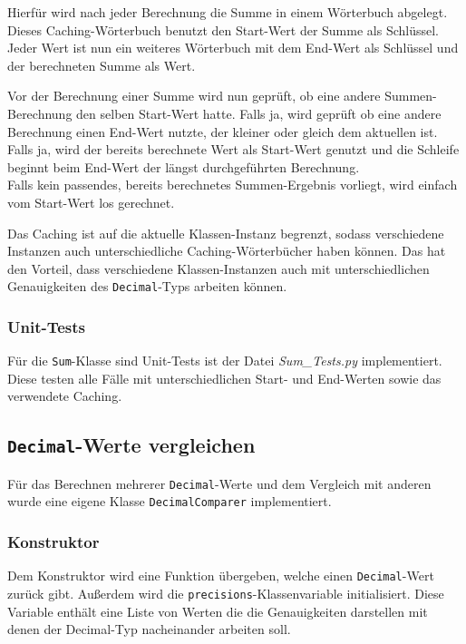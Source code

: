 \documentclass{article}
\begin{document}
		Hierfür wird nach jeder Berechnung die Summe in einem Wörterbuch abgelegt. Dieses Caching-Wörterbuch benutzt den Start-Wert der Summe als Schlüssel. Jeder Wert ist nun ein weiteres Wörterbuch mit dem End-Wert als Schlüssel und der berechneten Summe als Wert.
		
		Vor der Berechnung einer Summe wird nun geprüft, ob eine andere Summen-Berechnung den selben Start-Wert hatte. Falls ja, wird geprüft ob eine andere Berechnung einen End-Wert nutzte, der kleiner oder gleich dem aktuellen ist.  Falls ja, wird der bereits berechnete Wert als Start-Wert genutzt und die Schleife beginnt beim End-Wert der längst durchgeführten Berechnung. \\
		Falls kein passendes, bereits berechnetes Summen-Ergebnis vorliegt, wird einfach vom Start-Wert los gerechnet.
		
		Das Caching ist auf die aktuelle Klassen-Instanz begrenzt, sodass verschiedene Instanzen auch unterschiedliche Caching-Wörterbücher haben können. Das hat den Vorteil, dass verschiedene Klassen-Instanzen auch mit unterschiedlichen Genauigkeiten des \verb|Decimal|-Typs arbeiten können.
	
	\subsubsection{Unit-Tests}
	
		Für die \verb|Sum|-Klasse sind Unit-Tests ist der Datei \emph{Sum\_Tests.py} implementiert. Diese testen alle Fälle mit unterschiedlichen Start- und End-Werten sowie das verwendete Caching.
	
	\subsection{\texttt{Decimal}-Werte vergleichen}
	
		Für das Berechnen mehrerer \verb|Decimal|-Werte und dem Vergleich mit anderen wurde eine eigene Klasse \verb|DecimalComparer| implementiert. 
	
	\subsubsection{Konstruktor}
		
		Dem Konstruktor wird eine Funktion übergeben, welche einen \verb|Decimal|-Wert zurück gibt. Außerdem wird die \verb|precisions|-Klassenvariable initialisiert. Diese Variable enthält eine Liste von Werten die die Genauigkeiten darstellen mit denen der Decimal-Typ nacheinander arbeiten soll.
	
\end{document}
